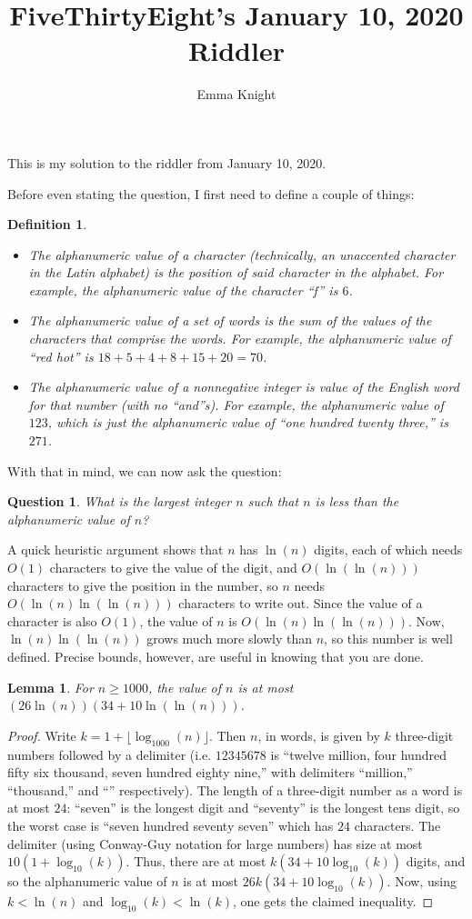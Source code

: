 \documentclass[11pt]{article}
\title{FiveThirtyEight's January 10, 2020 Riddler}
\author{Emma Knight}
\newtheorem{question}[theorem]{Question}
\newtheorem{lemma}[theorem]{Lemma}
\newtheorem{definition}[theorem]{Definition}
\theoremstyle{definition}
\begin{document}
\maketitle
This is my solution to the riddler from January 10, 2020.

Before even stating the question, I first need to define a couple of things:
\begin{definition}
\begin{itemize}
\item The alphanumeric value of a character (technically, an unaccented character in the Latin alphabet) is the position of said character in the alphabet.  For example, the alphanumeric value of the character ``f'' is $6$.
\item The alphanumeric value of a set of words is the sum of the values of the characters that comprise the words.  For example, the alphanumeric value of ``\emph{red hot}'' is $18 + 5 + 4 + 8 + 15 + 20 = 70$.
\item The alphanumeric value of a nonnegative integer is value of the English word for that number (with no ``and''s).  For example, the alphanumeric value of $123$, which is just the alphanumeric value of ``\emph{one hundred twenty three},'' is $271$.
\end{itemize}
\end{definition}

With that in mind, we can now ask the question:
\begin{question}
What is the largest integer $n$ such that $n$ is less than the alphanumeric value of $n$?
\end{question}
A quick heuristic argument shows that $n$ has $\ln(n)$ digits, each of which needs $O(1)$ characters to give the value of the digit, and $O(\ln(\ln(n)))$ characters to give the position in the number, so $n$ needs $O(\ln(n)\ln(\ln(n)))$ characters to write out.  Since the value of a character is also $O(1)$, the value of $n$ is $O(\ln(n)\ln(\ln(n)))$.  Now, $\ln(n)\ln(\ln(n))$ grows much more slowly than $n$, so this number is well defined.  Precise bounds, however, are useful in knowing that you are done.
\begin{lemma}
For $n \geq 1000$, the value of $n$ is at most $(26\ln(n))(34 +10\ln(\ln(n)))$.
\end{lemma}
\begin{proof}
Write $k = 1 + \lfloor \log_{1000}(n) \rfloor$.  Then $n$, in words, is given by $k$ three-digit numbers followed by a delimiter (i.e. $12345678$ is ``twelve million, four hundred fifty six thousand, seven hundred eighty nine,'' with delimiters ``million,'' ``thousand,'' and ``'' respectively).  The length of a three-digit number as a word is at most $24$: ``seven'' is the longest digit and ``seventy'' is the longest tens digit, so the worst case is ``seven hundred seventy seven'' which has $24$ characters.  The delimiter (using Conway-Guy notation for large numbers) has size at most $10(1+\log_{10}(k))$.  Thus, there are at most $k(34 + 10\log_{10}(k))$ digits, and so the alphanumeric value of $n$ is at most $26k(34 + 10\log_{10}(k))$.  Now, using $k < \ln(n)$ and $\log_{10}(k) < \ln(k)$, one gets the claimed inequality.
\end{proof}
\end{document}
